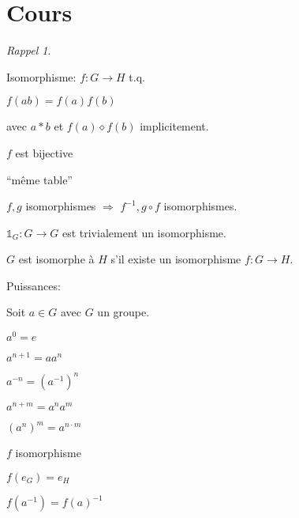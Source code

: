 \documentclass{report}
\newcounter{cours}
\newcommand*{\cours}{\section*{Cours \thecours}\stepcounter{cours}}
\newcommand*{\identite}{\mathds{1}}
\theoremstyle{definition}
\theoremstyle{remark}
\newtheorem*{rappel}{Rappel}
\begin{document}
	\cours
	\begin{rappel}
		~

		\begin{ulist}[noitemsep]
			\item Isomorphisme: $f:G \to H$ t.q.
			\begin{nlist}
				\item $f(ab)=f(a)f(b)$

				avec $a *b$ et $f(a) \diamond f(b)$ implicitement.
				\item $f$ est bijective
			\end{nlist}
			``m\^eme table''
			\item $f,g$ isomorphismes $\Rightarrow$ $f^{-1}, g \circ f$ isomorphismes.

			$\identite_G:G \to G$ est trivialement un isomorphisme.
			\item $G$ est isomorphe \`a $H$ s'il existe un isomorphisme $f:G \to H$.
			\item Puissances:

			Soit $a \in G$ avec $G$ un groupe.
			\begin{ulist}
				\item $a^0=e$
				\item $a^{n+1}=aa^n$
				\item $a^{-n}=(a^{-1})^n$
				\item $a^{n+m}=a^na^m$
				\item $(a^n)^m=a^{n \cdot m}$
			\end{ulist}
			\item $f$ isomorphisme
			\begin{ulist}
				\item $f(e_G)=e_H$
				\item $f(a^{-1})=f(a)^{-1}$
			\end{ulist}
		\end{ulist}
	\end{rappel}
\end{document}
